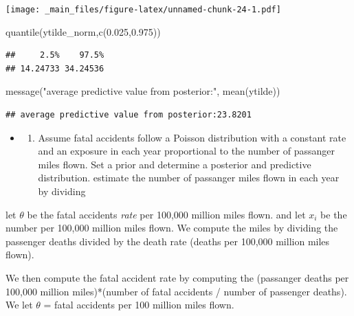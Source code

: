 \documentclass[
]{book}
\newenvironment{Shaded}{\begin{snugshade}}{\end{snugshade}}
\newcommand{\FloatTok}[1]{\textcolor[rgb]{0.00,0.00,0.81}{#1}}
\newcommand{\FunctionTok}[1]{\textcolor[rgb]{0.00,0.00,0.00}{#1}}
\newcommand{\NormalTok}[1]{#1}
\newcommand{\StringTok}[1]{\textcolor[rgb]{0.31,0.60,0.02}{#1}}
\providecommand{\tightlist}{%
  \setlength{\itemsep}{0pt}\setlength{\parskip}{0pt}}
\theoremstyle{definition}
\theoremstyle{definition}
\theoremstyle{definition}
\theoremstyle{definition}
\theoremstyle{remark}
\begin{document}
\texttt{[image: \_main\_files/figure-latex/unnamed-chunk-24-1.pdf]}

\begin{Shaded}
\begin{Highlighting}[]
 \FunctionTok{quantile}\NormalTok{(ytilde\_norm,}\FunctionTok{c}\NormalTok{(}\FloatTok{0.025}\NormalTok{,}\FloatTok{0.975}\NormalTok{))}
\end{Highlighting}
\end{Shaded}

\begin{verbatim}
##     2.5%    97.5% 
## 14.24733 34.24536
\end{verbatim}

\begin{Shaded}
\begin{Highlighting}[]
 \FunctionTok{message}\NormalTok{(}\StringTok{"average predictive value from posterior:"}\NormalTok{, }\FunctionTok{mean}\NormalTok{(ytilde))}
\end{Highlighting}
\end{Shaded}

\begin{verbatim}
## average predictive value from posterior:23.8201
\end{verbatim}

\begin{itemize}
\item
  \begin{enumerate}
  \def\labelenumi{(\alph{enumi})}
  \setcounter{enumi}{1}
  \tightlist
  \item
    Assume fatal accidents follow a Poisson distribution with a constant rate and an exposure in each year proportional to the number of passanger miles flown. Set a prior and determine a posterior and predictive distribution. estimate the number of passanger miles flown in each year by dividing
  \end{enumerate}
\end{itemize}

let \(\theta\) be the fatal accidents \emph{rate} per 100,000 million miles flown. and let \(x_i\) be the number per 100,000 million miles flown. We compute the miles by dividing the passenger deaths divided by the death rate (deaths per 100,000 million miles flown).

We then compute the fatal accident rate by computing the (passanger deaths per 100,000 million miles)*(number of fatal accidents / number of passenger deaths). We let \(\theta\) = fatal accidents per 100 million miles flown.
\end{document}
